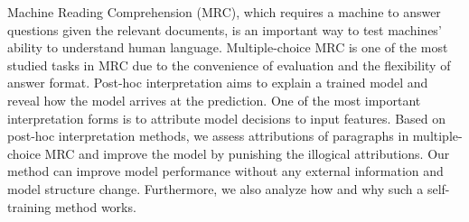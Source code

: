 Machine Reading Comprehension (MRC), which requires a machine to answer questions given the relevant documents, is an important way to test machines' ability to understand human language. Multiple-choice MRC is one of the most studied tasks in MRC due to the convenience of evaluation and the flexibility of answer format. Post-hoc interpretation aims to explain a trained model and reveal how the model arrives at the prediction. One of the most important interpretation forms is to attribute model decisions to input features. Based on post-hoc interpretation methods, we assess attributions of paragraphs in multiple-choice MRC and improve the model by punishing the illogical attributions. Our method can improve model performance without any external information and model structure change. Furthermore, we also analyze how and why such a self-training method works.
